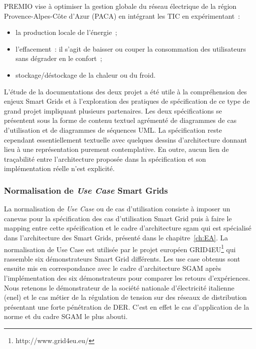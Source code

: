 PREMIO vise à optimiser la gestion globale du réseau électrique de la région 
Provence-Alpes-Côte d'Azur (PACA) en intégrant les TIC en expérimentant~:
\begin{itemize}
\item la production locale de l'énergie~;
\item l'effacement~: il s'agit de baisser ou couper la consommation des 
utilisateurs sans dégrader en le confort~;
\item stockage/déstockage de la chaleur ou du froid.
\end{itemize}

L'étude de la documentations des deux projet a été utile à la compréhension des 
enjeux Smart Grids et à l'exploration des pratiques de spécification de ce type 
de grand projet impliquant plusieurs partenaires. Les deux spécifications se 
présentent sous la forme de contenu textuel agrémenté de diagrammes de cas 
d'utilisation et de diagrammes de séquences UML. La spécification reste 
cependant essentiellement textuelle avec quelques dessins d'architecture donnant 
lieu à une représentation purement contemplative. En outre, aucun lien de 
traçabilité entre l'architecture proposée dans la spécification et son 
implémentation réelle n'est explicité.
 
\subsubsection{Normalisation de \textit{Use Case} Smart Grids}
\label{sec:ENEL}

La normalisation de \textit{Use Case} ou de cas d'utilisation consiste 
à imposer un canevas pour la spécification des cas d'utilisation Smart Grid puis 
à faire le mapping entre cette spécification et le cadre d'architecture \gls{sgam} qui 
est spécialisé dans l'architecture des Smart Grids, présenté dans le 
chapitre~\ref{ch:EA}.
La normalisation de Use Case est utilisée par le projet européen GRID4EU\footnote{http://www.grid4eu.eu/} qui rassemble six démonstrateurs Smart Grid différents. Les use case obtenus sont ensuite mis en correspondance avec le cadre d'architecture \gls{SGAM} après l'implémentation des six démonstrateurs pour comparer les 
retours d'expériences. Nous retenons le démonstrateur de la société nationale d'électricité italienne (\gls{enel}) et le cas métier de la régulation de tension sur des réseaux de distribution présentant une forte pénétration de DER. C'est en effet le cas d'application de la norme et du cadre \gls{SGAM} le plus abouti. 


